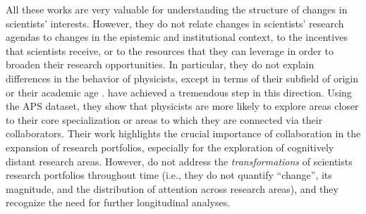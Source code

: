 \documentclass{article}
\begin{document}
All these works are very valuable for understanding the structure of changes in scientists' interests. %
However, they do not relate changes in scientists' research agendas to changes in the epistemic and institutional context, to the incentives that scientists receive, or to the resources that they can leverage in order to broaden their research opportunities. In particular, they do not explain differences in the behavior of physicists, except in terms of their subfield of origin or their academic age \citep{Zeng2019,Aleta2019}. \citet{Tripodi2020} have achieved a tremendous step in this direction. Using the APS dataset, they show that physicists are more likely to explore areas closer to their core specialization or areas to which they are connected via their collaborators. Their work highlights the crucial importance of collaboration in the expansion of research portfolios, especially for the exploration of cognitively distant research areas. %
However, \citeauthor{Tripodi2020} do not address the \textit{transformations} of scientists research portfolios throughout time (i.e., they do not quantify ``change'', its magnitude, and the distribution of attention across research areas), and they recognize the need for further longitudinal analyses.
\end{document}
